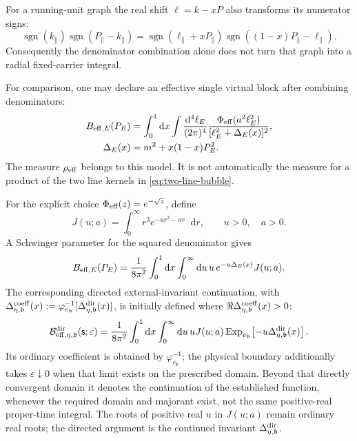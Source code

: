 \documentclass[final,5p,times,twocolumn,numbers,nopreprintline]{elsarticle}
\numberwithin{equation}{section}
\theoremstyle{definition}
\theoremstyle{remark}
\newcommand{\dd}{\mathop{}\!\mathrm d}
\newcommand{\bb}{\mathfrak b}
\newcommand{\Ph}{\Phi}
\newcommand{\sgn}{\operatorname{sgn}}
\newcommand{\ee}{e_{\bb}}
\newcommand{\embed}{\varphi_{\ee}}
\newcommand{\ExpDir}{\operatorname{Exp}_{\ee}}
\newcommand{\sMand}{\mathsf{s}}
\begin{document}
For a running-unit graph the real shift \(\ell=k-xP\)
also transforms its numerator signs:
\begin{equation}
 \sgn(k_\parallel)\sgn(P_\parallel-k_\parallel)
 =\sgn(\ell_\parallel+xP_\parallel)
   \sgn((1-x)P_\parallel-\ell_\parallel).
 \label{eq:running-signs-after-parameter-shift}
\end{equation}
Consequently the denominator combination alone does not turn
that graph into a radial fixed-carrier integral.

For comparison, one may declare an effective single virtual block
after combining denominators:
\begin{equation}
\begin{aligned}
 B_{{\rm eff},E}(P_E)
   &=\int_0^1\dd x\int\frac{\dd^4\ell_E}{(2\pi)^4}
       \frac{\Ph_{\rm eff}(a^2\ell_E^2)}
            {[\ell_E^2+\Delta_E(x)]^2},\\
 \Delta_E(x)&=m^2+x(1-x)P_E^2.
\end{aligned}
 \label{eq:effective-model}
\end{equation}
The measure \(\rho_{\rm eff}\) belongs to this model. It is not
automatically the measure for a product of the two line kernels
in \eqref{eq:two-line-bubble}.

For the explicit choice \(\Ph_{\rm eff}(z)=e^{-\sqrt z}\),
define
\begin{equation}
 J(u;a)=\int_0^\infty r^3e^{-ur^2-ar}\dd r,
 \qquad u>0,\quad a>0.
 \label{eq:J-radial}
\end{equation}
A Schwinger parameter for the squared denominator gives
\begin{equation}
 B_{{\rm eff},E}(P_E)
   =\frac1{8\pi^2}\int_0^1\dd x
        \int_0^\infty\dd u\,
              u\,e^{-u\Delta_E(x)}J(u;a).
 \label{eq:effective-J}
\end{equation}
The corresponding directed external-invariant continuation,
with \(\Delta^{\rm coeff}_{\eta,\bb}(x)
:=\embed^{-1}[\Delta^{\rm dir}_{\eta,\bb}(x)]\),
is initially defined where
\(\Re\Delta^{\rm coeff}_{\eta,\bb}(x)>0\):
\begin{equation}
 \mathcal B^{\rm dir}_{{\rm eff},\eta,\bb}(\sMand;\varepsilon)
  =\frac1{8\pi^2}\int_0^1\dd x\int_0^\infty\dd u\,
       u J(u;a)\ExpDir\!\left[
                  -u\Delta^{\rm dir}_{\eta,\bb}(x)\right].
 \label{eq:effective-directed-J}
\end{equation}
Its ordinary coefficient is obtained by \(\embed^{-1}\);
the physical boundary additionally takes \(\varepsilon\downarrow0\)
when that limit exists on the prescribed domain.
Beyond that directly convergent domain it denotes the continuation
of the established function, whenever the required domain and
majorant exist, not the same positive-real proper-time integral.
The roots of positive real \(u\) in \(J(u;a)\) remain ordinary
real roots; the directed argument is the continued invariant
\(\Delta^{\rm dir}_{\eta,\bb}\).
\end{document}
